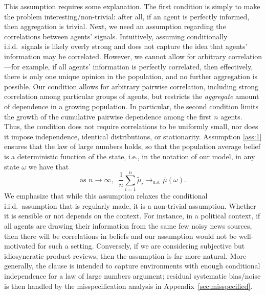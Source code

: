 \documentclass[12pt,reqno]{amsart}
\begin{document}
This assumption requires some explanation. The first condition is simply to make the problem interesting/non-trivial: after all, if an agent is perfectly informed, then aggregation is trivial. Next, we need an assumption regarding the correlations between agents' signals. Intuitively, assuming conditionally i.i.d.\ signals is likely overly strong and does not capture the idea that agents' information may be correlated. However, we cannot allow for arbitrary correlation---for example, if all agents' information is perfectly correlated, then effectively, there is only one unique opinion in the population, and no further aggregation is possible. Our condition allows for arbitrary pairwise correlation, including strong correlation among particular groups of agents, but restricts the \emph{aggregate} amount of dependence in a growing population. In particular, the second condition limits the growth of the cumulative pairwise dependence among the first $n$ agents. Thus, the condition does not require correlations to be uniformly small, nor does it impose independence, identical distributions, or stationarity. Assumption \ref{ass:1} ensures that the law of large numbers holds, so that the population average belief is a deterministic function of the state, i.e., in the notation of our model, in any state $\omega$ we have that
    \[
    \text{as } n \to \infty,\;\; \frac1n \sum_{i=1}^n \tilde{\mu}_i \to_{a.s.} \bar{\mu}(\omega).
    \]
We emphasize that while this assumption relaxes the conditional i.i.d.\ assumption that is regularly made, it is a non-trivial assumption. Whether it is sensible or not depends on the context. For instance, in a political context, if all agents are drawing their information from the same few noisy news sources, then there will be correlations in beliefs and our assumption would not be well-motivated for such a setting. Conversely, if we are considering subjective but idiosyncratic product reviews, then the assumption is far more natural. More generally, the clause is intended to capture environments with enough conditional independence for a law of large numbers argument; residual systematic bias/noise is then handled by the misspecification analysis in Appendix~\ref{sec:misspecified}.
\end{document}
